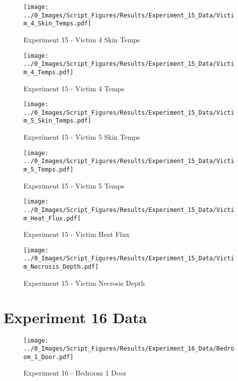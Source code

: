 	\begin{figure}[H]
		\centering
		\texttt{[image: ../0\_Images/Script\_Figures/Results/Experiment\_15\_Data/Victim\_4\_Skin\_Temps.pdf]}
		\caption[]{Experiment 15 - Victim 4 Skin Temps}
	\end{figure}
 
	\clearpage

	\begin{figure}[H]
		\centering
		\texttt{[image: ../0\_Images/Script\_Figures/Results/Experiment\_15\_Data/Victim\_4\_Temps.pdf]}
		\caption[]{Experiment 15 - Victim 4 Temps}
	\end{figure}
 

	\begin{figure}[H]
		\centering
		\texttt{[image: ../0\_Images/Script\_Figures/Results/Experiment\_15\_Data/Victim\_5\_Skin\_Temps.pdf]}
		\caption[]{Experiment 15 - Victim 5 Skin Temps}
	\end{figure}
 
	\clearpage

	\begin{figure}[H]
		\centering
		\texttt{[image: ../0\_Images/Script\_Figures/Results/Experiment\_15\_Data/Victim\_5\_Temps.pdf]}
		\caption[]{Experiment 15 - Victim 5 Temps}
	\end{figure}
 

	\begin{figure}[H]
		\centering
		\texttt{[image: ../0\_Images/Script\_Figures/Results/Experiment\_15\_Data/Victim\_Heat\_Flux.pdf]}
		\caption[]{Experiment 15 - Victim Heat Flux}
	\end{figure}
 
	\clearpage

	\begin{figure}[H]
		\centering
		\texttt{[image: ../0\_Images/Script\_Figures/Results/Experiment\_15\_Data/Victim\_Necrosis\_Depth.pdf]}
		\caption[]{Experiment 15 - Victim Necrosis Depth}
	\end{figure}
 

\clearpage		\large
\section{Experiment 16 Data} \label{App:Exp16Results} 

	\begin{figure}[H]
		\centering
		\texttt{[image: ../0\_Images/Script\_Figures/Results/Experiment\_16\_Data/Bedroom\_1\_Door.pdf]}
		\caption[]{Experiment 16 - Bedroom 1 Door}
	\end{figure}
 

